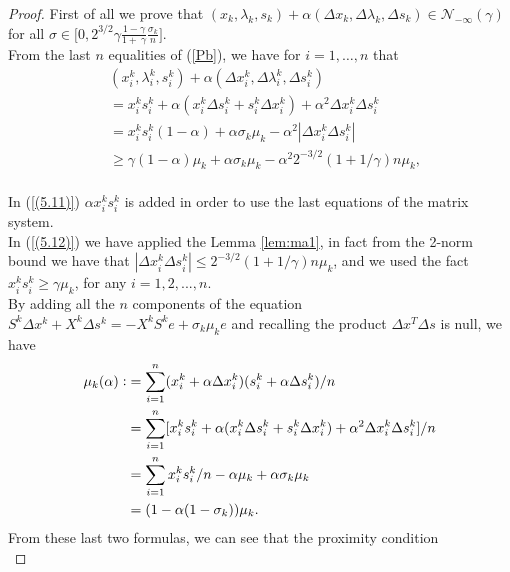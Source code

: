 \documentclass[a4paper,10 pt,titlepage,twoside]{book}
\theoremstyle{plain}
\theoremstyle{definition}
\theoremstyle{remark}
\begin{document}
\begin{proof}
	First of all we prove that $(x_{k}, \lambda_{k}, s_{k})+\alpha(\Delta x_{k},\Delta \lambda_{k},\Delta s_{k})\in\mathcal{N}_{-\infty}(\gamma)$ for all $\sigma \in \bigg[0,2^{3/2}\gamma \frac{1 - \gamma}{1 +\ \gamma}\frac{\sigma_{k}}{n}\bigg]$.\\
	
	From the last $n$ equalities of (\ref{Pb}), we have for $i=1,\dots,n$ that 
	\begin{align}&(x_{i}^{k}, \lambda_{i}^{k}, s_{i}^{k})+\alpha(\Delta x_{i}^{k},\Delta \lambda_{i}^{k},\Delta s_{i}^{k})\\ 
	 &=x_{i}^{k}s_{i}^{k} + \alpha(x_{i}^{k} \Delta s_{i}^{k} + s_{i}^{k} \Delta x_{i}^{k})+\alpha^{2}\Delta x_{i}^{k} \Delta s_{i}^{k} \\
	&=x_{i}^{k}s_{i}^{k}(1 - \alpha) + \alpha \sigma_{k}\mu_{k}-\alpha^{2}|\Delta x_{i}^{k} \Delta s_{i}^{k}| \label{(5.11)}\\
	&\geq \gamma(1 - \alpha)\mu_{k} + \alpha \sigma_{k}\mu_{k}-\alpha^{2}2^{-3/2}(1 + 1/ \gamma)n\mu_{k} \label{(5.12)},
	\end{align}
	\\
	In (\ref{(5.11)}) $\alpha x_{i}^{k}s_{i}^{k}$ is added in order to use the last equations of the matrix system.\\ 
	In (\ref{(5.12)}) we have applied the Lemma \ref{lem:ma1}, in fact from the 2-norm bound we have that $|\Delta x_{i}^{k}\Delta s_{i}^{k}|\leq2^{-3/2}(1 + 1/\gamma)n\mu_{k}$, and we used the fact $x_{i}^{k}s_{i}^{k}\geq \gamma\mu_{k}$, for any $i = 1,2,...,n$. \\
	By adding all the $n$ components of the equation $S^{k}\Delta x^{k} + X^{k} \Delta s^{k} = -X^{k}S^{k}e + \sigma_{k} \mu_{k}e$ and recalling the product $\Delta x^{T} \Delta s$ is null, we have
	\begin{align*}\mu_{k}(\alpha)\vcentcolon&=\sum_{i=1}^{n}(x_{i}^{k} + \alpha\Delta x_{i}^{k})(s_{i}^{k} + \alpha\Delta s_{i}^{k})/n\\
&=\sum_{i=1}^{n}[x_{i}^{k}s_{i}^{k}+\alpha(x_{i}^{k}\Delta s_{i}^{k} + s_{i}^{k}\Delta x_{i}^{k}) +\alpha^{2}\Delta x_{i}^{k}\Delta s_{i}^{k}]/n\\
	&=\sum_{i=1}^{n}x_{i}^{k}s_{i}^{k}/n - \alpha \mu_{k}+\alpha \sigma_{k} \mu_{k} \\
	&=(1-\alpha(1-\sigma_{k}))\mu_{k}.
	\end{align*}
	From these last two formulas, we can see that the proximity condition
	\begin{equation*}

\end{equation*}
\end{proof}
\end{document}
